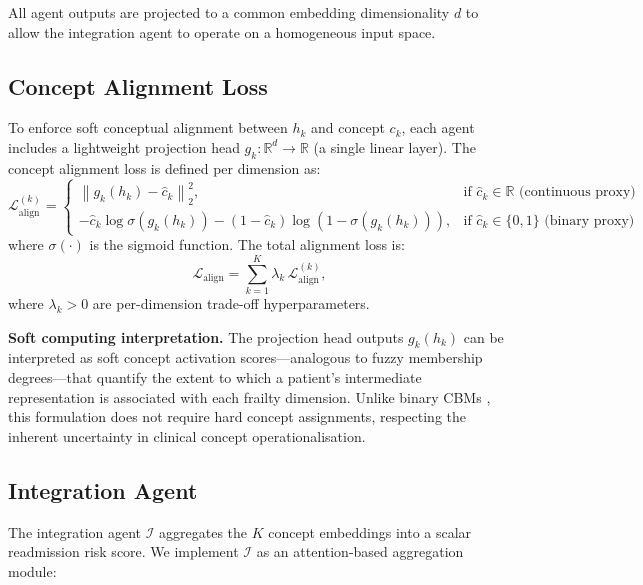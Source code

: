 \documentclass[review,12pt,authoryear]{elsarticle}
\begin{document}
All agent outputs are projected to a common embedding dimensionality $d$ to allow the integration agent to operate on a homogeneous input space.

\subsection{Concept Alignment Loss}
\label{subsec:alignment}

To enforce soft conceptual alignment between $h_k$ and concept $c_k$, each agent includes a lightweight projection head $g_k: \mathbb{R}^d \to \mathbb{R}$ (a single linear layer).
The concept alignment loss is defined per dimension as:
\begin{equation}
  \mathcal{L}_{\text{align}}^{(k)} =
  \begin{cases}
    \left\|g_k(h_k) - \hat{c}_k\right\|_2^2, & \text{if } \hat{c}_k \in \mathbb{R} \text{ (continuous proxy)} \\[4pt]
    -\hat{c}_k \log \sigma(g_k(h_k)) - (1-\hat{c}_k)\log(1-\sigma(g_k(h_k))), & \text{if } \hat{c}_k \in \{0,1\} \text{ (binary proxy)}
  \end{cases}
  \label{eq:align_per}
\end{equation}
where $\sigma(\cdot)$ is the sigmoid function.
The total alignment loss is:
\begin{equation}
  \mathcal{L}_{\text{align}} = \sum_{k=1}^{K} \lambda_k\, \mathcal{L}_{\text{align}}^{(k)},
  \label{eq:align_total}
\end{equation}
where $\lambda_k > 0$ are per-dimension trade-off hyperparameters.

\textbf{Soft computing interpretation.}
The projection head outputs $g_k(h_k)$ can be interpreted as soft concept activation scores—analogous to fuzzy membership degrees—that quantify the extent to which a patient's intermediate representation is associated with each frailty dimension.
Unlike binary CBMs \citep{koh2020concept}, this formulation does not require hard concept assignments, respecting the inherent uncertainty in clinical concept operationalisation.

\subsection{Integration Agent}
\label{subsec:integration}

The integration agent $\mathcal{I}$ aggregates the $K$ concept embeddings into a scalar readmission risk score.
We implement $\mathcal{I}$ as an attention-based aggregation module:
\end{document}
